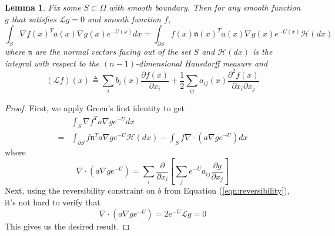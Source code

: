 \documentclass[12pt, nofootinbib,english, amsmath, amssymb, aps, priprint, graphicx,floatfix]{revtex4-1}
\newtheorem{lemma}{Lemma}
\theoremstyle{plain}
\theoremstyle{definition}
\theoremstyle{plain}
\newcommand{\normal}{{\mathfrak{n}}}
\newcommand{\hausdorffmeasure}{\mathscr{H}(dx)}
\begin{document}
\begin{lemma}  \label{lem:greenident}Fix some $S \subset \Omega$ with smooth boundary.  Then for any smooth function $g$ that satisfies $\mathcal{L}g = 0$ and smooth function $f$,
\begin{equation*}
\int_{S} \nabla f(x)^T a(x) \nabla g(x) e^{-U(x)}dx = \int_{\partial S} f(x) \normal(x)^T a(x) \nabla g(x) e^{-U(x)}\hausdorffmeasure
\end{equation*}
where $\normal$ are the normal vectors facing out of the set $S$ and $\hausdorffmeasure$ is the integral with respect to the $(n-1)$-dimensional Hausdorff measure and 
\[
(\mathcal{L}f)(x) \triangleq \sum_i b_i(x) \frac{\partial f (x)}{\partial x_i} + 
    \frac{1}{2} \sum_{ij}a_{ij}(x)\frac{\partial^2 f(x)}{\partial x_i \partial x_j} 
\]
\end{lemma}
\begin{proof}
First, we apply Green's first identity to get
\begin{align*}
	 &\int_{S} \nabla f^T a \nabla g e^{-U} dx\\
	=&\int_{\partial S}f \normal^T a \nabla g e^{-U} \hausdorffmeasure - \int_{S} f \nabla \cdot (a \nabla g e^{-U}) dx
\end{align*}
where
\begin{equation*}
	\nabla \cdot (a \nabla g e^{-U}) = \sum_{i}\frac{\partial}{\partial x_i}\left[\sum_{j}e^{-U}a_{i j}\frac{\partial g}{\partial x_j}\right]
\end{equation*}
Next, using the reversibility constraint on $b$ from Equation (\ref{eqn:reversibility}), it's not hard to verify that 
\begin{equation*}
	\nabla \cdot (a \nabla g e^{-U}) = 2e^{-U}\mathcal{L} g = 0
\end{equation*}
This gives us the desired result.
\end{proof}
\end{document}
